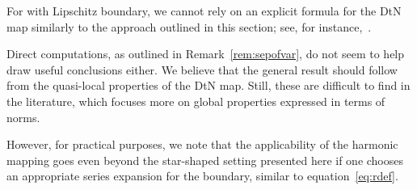 \begin{remark}
    For  with Lipschitz boundary, we cannot rely on an explicit formula for the DtN map similarly to the approach outlined in this section; see, for instance,~\cite{girouard2022}.

    Direct computations, as outlined in Remark~\ref{rem:sepofvar}, do not seem to help draw useful conclusions either.
    We believe that the general result should follow from the quasi-local properties of the DtN map.
    Still, these are difficult to find in the literature, which focuses more on global properties expressed in terms of norms.

    \begin{revenv}
        However, for practical purposes, we note that the applicability of the harmonic mapping goes even beyond the star-shaped setting presented here if one chooses an appropriate series expansion for the boundary, similar to equation~\eqref{eq:rdef}.
    \end{revenv}
\end{remark}